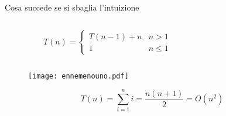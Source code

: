 
\begin{frame}{Cosa succede se si sbaglia l'intuizione}

\vspace{-6pt}
\begin{mybox}
\begin{columns}[c]
\begin{column}{0.46\textwidth}
\[
T(n) = \begin{cases}
      T( n-1 )  + n & n > 1 \\
     1 & n \leq 1
  \end{cases}
\]
\end{column}
\begin{column}{0.51\textwidth}
\end{column}
\end{columns}
\end{mybox}

\begin{overprint}
\begin{figure}
	\texttt{[image: ennemenouno.pdf]}
\end{figure}
\[
T(n) = \sum_{i=1}^n i = \frac{n (n+1)}{2} = O(n^2)
\]
\end{overprint}

\end{frame}

